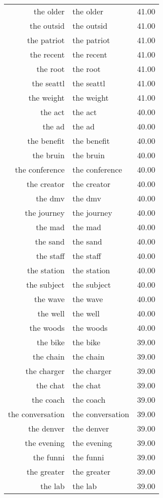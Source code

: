 \begin{table}[ht]
\begin{tabular}{rlr}
  the older & the older & 41.00 \\ 
  the outsid & the outsid & 41.00 \\ 
  the patriot & the patriot & 41.00 \\ 
  the recent & the recent & 41.00 \\ 
  the root & the root & 41.00 \\ 
  the seattl & the seattl & 41.00 \\ 
  the weight & the weight & 41.00 \\ 
  the act & the act & 40.00 \\ 
  the ad & the ad & 40.00 \\ 
  the benefit & the benefit & 40.00 \\ 
  the bruin & the bruin & 40.00 \\ 
  the conference & the conference & 40.00 \\ 
  the creator & the creator & 40.00 \\ 
  the dmv & the dmv & 40.00 \\ 
  the journey & the journey & 40.00 \\ 
  the mad & the mad & 40.00 \\ 
  the sand & the sand & 40.00 \\ 
  the staff & the staff & 40.00 \\ 
  the station & the station & 40.00 \\ 
  the subject & the subject & 40.00 \\ 
  the wave & the wave & 40.00 \\ 
  the well & the well & 40.00 \\ 
  the woods & the woods & 40.00 \\ 
  the bike & the bike & 39.00 \\ 
  the chain & the chain & 39.00 \\ 
  the charger & the charger & 39.00 \\ 
  the chat & the chat & 39.00 \\ 
  the coach & the coach & 39.00 \\ 
  the conversation & the conversation & 39.00 \\ 
  the denver & the denver & 39.00 \\ 
  the evening & the evening & 39.00 \\ 
  the funni & the funni & 39.00 \\ 
  the greater & the greater & 39.00 \\ 
  the lab & the lab & 39.00 \\ 

\end{tabular}
\end{table}
